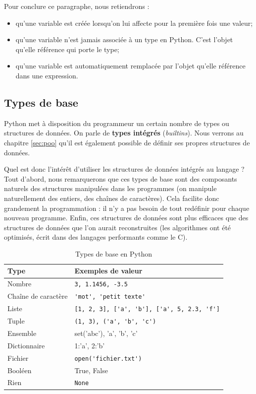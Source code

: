 \documentclass[12pt, a4paper]{article}
\begin{document}
Pour conclure ce paragraphe, nous retiendrons :
\begin{itemize}
	\item qu'une variable est créée lorsqu'on lui affecte pour la première fois une valeur;
	\item qu'une variable n'est jamais associée à un type en Python. C'est l'objet qu'elle référence qui porte le type;
	\item qu'une variable est automatiquement remplacée par l'objet qu'elle référence dans une expression.
\end{itemize}


\subsection{Types de base}
Python met à disposition du programmeur un certain nombre de types ou structures de données. On parle de \textbf{types intégrés} (\textit{builtins}). Nous verrons au chapitre \ref{sec:poo} qu'il est également possible de définir ses propres structures de données.

Quel est donc l'intérêt d'utiliser les structures de données intégrés au langage ? 
Tout d'abord, nous remarquerons que ces types de base sont des composants naturels des structures manipulées dans les programmes (on manipule naturellement des entiers, des chaînes de caractères). Cela facilite donc grandement la programmation : il n'y a pas besoin de tout redéfinir pour chaque nouveau programme. Enfin, ces structures de données sont plus efficaces que des structures de données que l'on aurait reconstruites (les algorithmes ont été optimisés, écrit dans des langages performants comme le C).

\begin{table}[H]
	\begin{center}
		\begin{tabular}{l|l}
			\textbf{Type} & \textbf{Exemples de valeur} \\
			\hline
			Nombre & \lstinline{3, 1.1456, -3.5} \\
			Chaîne de caractère & \lstinline{'mot', 'petit texte'} \\
			Liste & \lstinline{[1, 2, 3], ['a', 'b'], ['a', 5, 2.3, 'f']} \\
			Tuple & \lstinline{(1, 3), ('a', 'b', 'c')} \\
			Ensemble & set('abc'), {'a', 'b', 'c'} \\
			Dictionnaire & {1:'a', 2:'b'} \\
			Fichier & \lstinline{open('fichier.txt')} \\
			Booléen & True, False \\
			Rien & \lstinline{None} \\
		\end{tabular}
		\caption{Types de base en Python}
		\label{tab:structure_donnees_base}
	\end{center}
\end{table}
\end{document}
